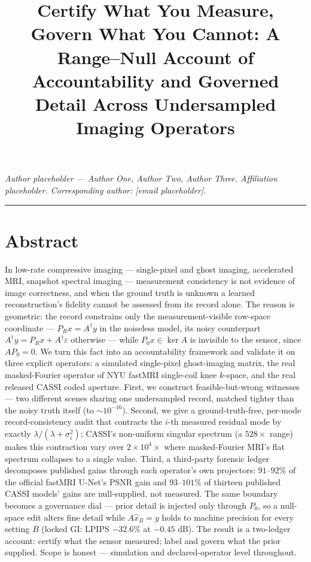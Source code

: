 \documentclass[11pt]{article}
\title{Certify What You Measure, Govern What You Cannot: A Range--Null Account of Accountability and Governed Detail Across Undersampled Imaging Operators}
\author{}\date{}
\begin{document}
\maketitle

\textit{Author placeholder --- Author One, Author Two, Author Three. Affiliation placeholder. Corresponding author: [email placeholder].}

\medskip\hrule\medskip

\section*{Abstract}

In low-rate compressive imaging --- single-pixel and ghost imaging, accelerated MRI, snapshot spectral imaging --- measurement consistency is not evidence of image correctness, and when the ground truth is unknown a learned reconstruction's fidelity cannot be assessed from its record alone. The reason is geometric: the record constrains only the measurement-visible row-space coordinate --- $P_R x = A^\dagger y$ in the noiseless model, its noisy counterpart $A^\dagger y = P_R x + A^\dagger\varepsilon$ otherwise --- while $P_0 x \in \ker A$ is invisible to the sensor, since $A P_0 = 0$. We turn this fact into an accountability framework and validate it on three explicit operators: a simulated single-pixel ghost-imaging matrix, the real masked-Fourier operator of NYU fastMRI single-coil knee $k$-space, and the real released CASSI coded aperture. First, we construct feasible-but-wrong witnesses --- two different scenes sharing one undersampled record, matched tighter than the noisy truth itself (to $\sim\!10^{-16}$). Second, we give a ground-truth-free, per-mode record-consistency audit that contracts the $i$-th measured residual mode by exactly $\lambda/(\lambda+\sigma_i^2)$; CASSI's non-uniform singular spectrum (a $528\times$ range) makes this contraction vary over $2\times10^4\times$ where masked-Fourier MRI's flat spectrum collapses to a single value. Third, a third-party forensic ledger decomposes published gains through each operator's own projectors: $91$--$92\%$ of the official fastMRI U-Net's PSNR gain and $93$--$101\%$ of thirteen published CASSI models' gains are null-supplied, not measured. The same boundary becomes a governance dial --- prior detail is injected only through $P_0$, so a null-space edit alters fine detail while $A\hat{x}_B = y$ holds to machine precision for every setting $B$ (locked GI: LPIPS $-32.6\%$ at $-0.45$ dB). The result is a two-ledger account: certify what the sensor measured; label and govern what the prior supplied. Scope is honest --- simulation and declared-operator level throughout.
\end{document}
